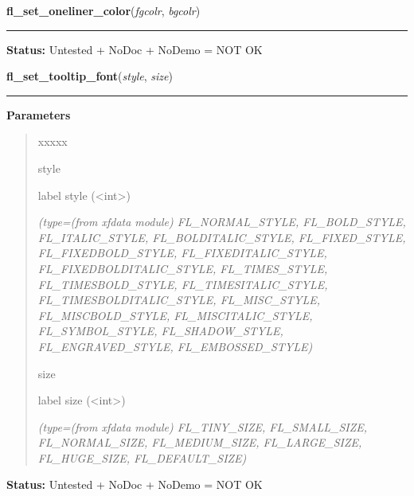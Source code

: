 \hspace{.8\funcindent}\begin{boxedminipage}{\funcwidth}

    \raggedright \textbf{fl\_set\_oneliner\_color}(\textit{fgcolr}, \textit{bgcolr})

    \vspace{-1.5ex}

    \rule{\textwidth}{0.5\fboxrule}
\setlength{\parskip}{2ex}
\setlength{\parskip}{1ex}
\textbf{Status:} Untested + NoDoc + NoDemo = NOT OK



    \end{boxedminipage}

    \label{xformslib:flgoodies:fl_set_tooltip_font}

    \vspace{0.5ex}

\hspace{.8\funcindent}\begin{boxedminipage}{\funcwidth}

    \raggedright \textbf{fl\_set\_tooltip\_font}(\textit{style}, \textit{size})

    \vspace{-1.5ex}

    \rule{\textwidth}{0.5\fboxrule}
\setlength{\parskip}{2ex}
\setlength{\parskip}{1ex}
      \textbf{Parameters}
      \vspace{-1ex}

      \begin{quote}
        \begin{Ventry}{xxxxx}

          \item[style]

          label style ({\textless}int{\textgreater})

            {\it (type=(from xfdata module) FL\_NORMAL\_STYLE, FL\_BOLD\_STYLE, FL\_ITALIC\_STYLE,
FL\_BOLDITALIC\_STYLE, FL\_FIXED\_STYLE, FL\_FIXEDBOLD\_STYLE, 
FL\_FIXEDITALIC\_STYLE, FL\_FIXEDBOLDITALIC\_STYLE, FL\_TIMES\_STYLE, 
FL\_TIMESBOLD\_STYLE, FL\_TIMESITALIC\_STYLE, FL\_TIMESBOLDITALIC\_STYLE, 
FL\_MISC\_STYLE, FL\_MISCBOLD\_STYLE, FL\_MISCITALIC\_STYLE, 
FL\_SYMBOL\_STYLE, FL\_SHADOW\_STYLE, FL\_ENGRAVED\_STYLE, 
FL\_EMBOSSED\_STYLE)}

          \item[size]

          label size ({\textless}int{\textgreater})

            {\it (type=(from xfdata module) FL\_TINY\_SIZE, FL\_SMALL\_SIZE, FL\_NORMAL\_SIZE, 
FL\_MEDIUM\_SIZE, FL\_LARGE\_SIZE, FL\_HUGE\_SIZE, FL\_DEFAULT\_SIZE)}

        \end{Ventry}

      \end{quote}

\textbf{Status:} Untested + NoDoc + NoDemo = NOT OK



    \end{boxedminipage}

